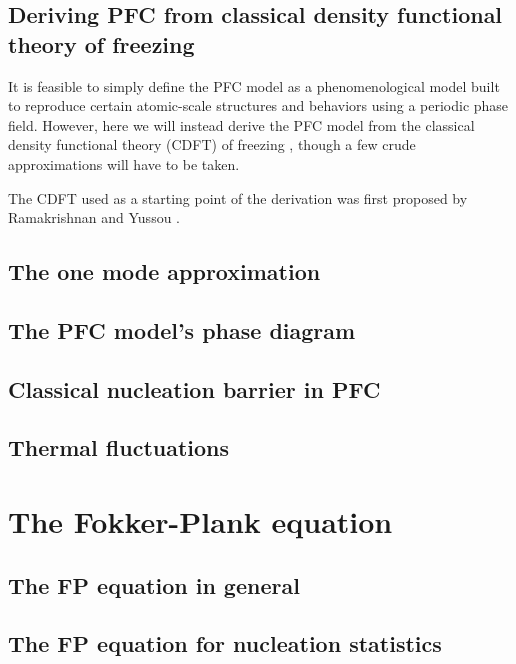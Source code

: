 \documentclass[a4paper]{article}
\begin{document}
\subsection{Deriving PFC from classical density functional theory of freezing}\label{subsec:pfc_deriv}

It is feasible to simply define the PFC model as a phenomenological model built to reproduce certain atomic-scale structures and behaviors using a periodic phase field. However, here we will instead derive the PFC model from the classical density functional theory (CDFT) of freezing \cite{provatas07,provatas_PFC}, though a few crude approximations will have to be taken.

The CDFT used as a starting point of the derivation was first proposed by Ramakrishnan and Yussou \cite{ramakrishnan79}.





\subsection{The one mode approximation}\label{subsec:pfc_1mode}
\subsection{The PFC model's phase diagram}\label{subsec:pfc_phasediag}
\subsection{Classical nucleation barrier in PFC}\label{subsec:pfc_classicbarrier}
\subsection{Thermal fluctuations}\label{subsec:pfc_noise}

\section{The Fokker-Plank equation}\label{sec:fopl}

\subsection{The FP equation in general}\label{subsec:fopl_general}
\subsection{The FP equation for nucleation statistics}\label{subsec:fopl_nucleation}
\end{document}
